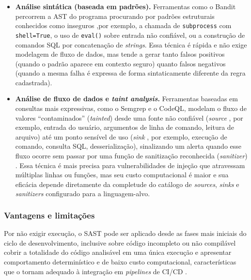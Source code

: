 \begin{itemize}
\item \textbf{Análise sintática (baseada em padrões).} Ferramentas como o Bandit percorrem a AST do programa procurando por padrões estruturais conhecidos como inseguros ,por exemplo, a chamada de \texttt{subprocess} com \texttt{shell=True}, o uso de \texttt{eval()} sobre entrada não confiável, ou a construção de comandos SQL por concatenação de \textit{strings}. Essa técnica é rápida e não exige modelagem de fluxo de dados, mas tende a gerar tanto falsos positivos (quando o padrão aparece em contexto seguro) quanto falsos negativos (quando a mesma falha é expressa de forma sintaticamente diferente da regra cadastrada).
\item \textbf{Análise de fluxo de dados e \textit{taint analysis}.} Ferramentas baseadas em consultas mais expressivas, como o Semgrep e o CodeQL, modelam o fluxo de valores ``contaminados'' (\textit{tainted}) desde uma fonte não confiável (\textit{source} , por exemplo, entrada do usuário, argumentos de linha de comando, leitura de arquivo) até um ponto sensível de uso (\textit{sink} , por exemplo, execução de comando, consulta SQL, desserialização), sinalizando um alerta quando esse fluxo ocorre sem passar por uma função de sanitização reconhecida (\textit{sanitizer}) \cite{Li2024SASTCC, Dalaq2025SASTSLR}. Essa técnica é mais precisa para vulnerabilidades de injeção que atravessam múltiplas linhas ou funções, mas seu custo computacional é maior e sua eficácia depende diretamente da completude do catálogo de \textit{sources}, \textit{sinks} e \textit{sanitizers} configurado para a linguagem-alvo.
\end{itemize}

\subsubsection{Vantagens e limitações}\label{subsubsec:sast-vantagens-limitacoes}

Por não exigir execução, o SAST pode ser aplicado desde as fases mais iniciais do ciclo de desenvolvimento, inclusive sobre código incompleto ou não compilável  cobrir a totalidade do código analisável em uma única execução e apresentar comportamento determinístico e de baixo custo computacional, características que o tornam adequado à integração em \textit{pipelines} de CI/CD \cite{Dalaq2025SASTSLR, Tamberg2025LLMHarness}.

